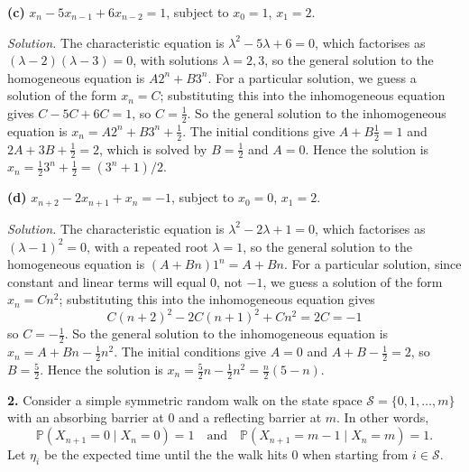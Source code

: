\documentclass[
  a4paper,
]{article}
\theoremstyle{definition}
\theoremstyle{definition}
\theoremstyle{definition}
\theoremstyle{remark}
\begin{document}
\textbf{(c)} \(x_n-5x_{n-1} + 6x_{n-2} = 1\), subject to \(x_0 = 1\), \(x_1 = 2\).

\begin{myanswers}

\emph{Solution.} The characteristic equation is \(\lambda^2 - 5\lambda + 6 = 0\), which factorises as \((\lambda - 2)(\lambda - 3) = 0\), with solutions \(\lambda = 2,3\), so the general solution to the homogeneous equation is \(A2^n + B3^n\). For a particular solution, we guess a solution of the form \(x_n = C\); substituting this into the inhomogeneous equation gives \(C - 5C + 6C = 1\), so \(C = \frac12\). So the general solution to the inhomogeneous equation is \(x_n = A2^n + B3^n + \frac12\). The initial conditions give \(A+B \frac12= 1\) and \(2A + 3B + \frac12= 2\), which is solved by \(B = \frac12\) and \(A = 0\). Hence the solution is \(x_n = \frac12 3^n + \frac12 = (3^n + 1)/2\).

\end{myanswers}

\textbf{(d)} \(x_{n+2} - 2x_{n+1} + x_n = -1\), subject to \(x_0 = 0\), \(x_1 = 2\).

\begin{myanswers}

\emph{Solution.} The characteristic equation is \(\lambda^2 - 2\lambda + 1 = 0\), which factorises as \((\lambda - 1)^2 = 0\), with a repeated root \(\lambda = 1\), so the general solution to the homogeneous equation is \((A + Bn)1^n = A + Bn\). For a particular solution, since constant and linear terms will equal \(0\), not \(-1\), we guess a solution of the form \(x_n = Cn^2\); substituting this into the inhomogeneous equation gives
\[ C(n+2)^2 - 2C(n+1)^2 + Cn^2 = 2C = -1  \]
so \(C = -\frac12\). So the general solution to the inhomogeneous equation is \(x_n = A + Bn - \frac12 n^2\). The initial conditions give \(A = 0\) and \(A + B - \frac12= 2\), so \(B = \frac52\). Hence the solution is \(x_n = \frac52n - \frac12n^2 = \frac n2(5-n)\).

\end{myanswers}

\textbf{2.} Consider a simple symmetric random walk on the state space \(\mathcal{S} = \{0,1,\ldots ,m\}\) with an absorbing barrier at \(0\) and a reflecting barrier at \(m\). In other words,
\[ \mathbb P(X_{n+1} = 0 \mid X_n = 0) = 1 \quad \text{and} \quad  \mathbb P(X_{n+1} = m-1 \mid X_n = m) = 1 . \]
Let \(\eta_i\) be the expected time until the the walk hits \(0\) when starting from \(i \in \mathcal S\).
\end{document}
